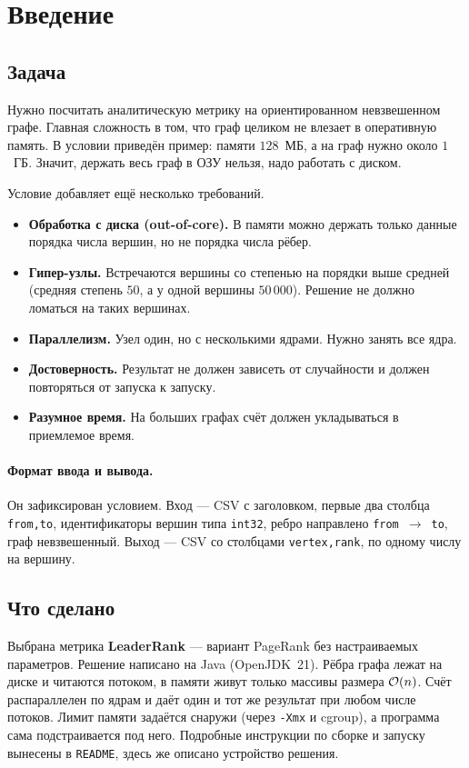 \section{Введение}
\label{sec:intro}

\subsection{Задача}
Нужно посчитать аналитическую метрику на ориентированном невзвешенном графе. Главная сложность в
том, что граф целиком не влезает в оперативную память. В условии приведён пример: памяти $128$~МБ, а
на граф нужно около $1$~ГБ. Значит, держать весь граф в ОЗУ нельзя, надо работать с диском.

Условие добавляет ещё несколько требований.
\begin{itemize}[nosep]
  \item \textbf{Обработка с диска (out-of-core).} В памяти можно держать только данные порядка числа
        вершин, но не порядка числа рёбер.
  \item \textbf{Гипер-узлы.} Встречаются вершины со степенью на порядки выше средней (средняя степень
        $50$, а у одной вершины $50\,000$). Решение не должно ломаться на таких вершинах.
  \item \textbf{Параллелизм.} Узел один, но с несколькими ядрами. Нужно занять все ядра.
  \item \textbf{Достоверность.} Результат не должен зависеть от случайности и должен повторяться от
        запуска к запуску.
  \item \textbf{Разумное время.} На больших графах счёт должен укладываться в приемлемое время.
\end{itemize}

\paragraph{Формат ввода и вывода.} Он зафиксирован условием. Вход --- CSV с заголовком, первые два
столбца \texttt{from,to}, идентификаторы вершин типа \texttt{int32}, ребро направлено
\texttt{from}~$\to$~\texttt{to}, граф невзвешенный. Выход --- CSV со столбцами \texttt{vertex,rank},
по одному числу на вершину.

\subsection{Что сделано}
Выбрана метрика \textbf{LeaderRank} --- вариант PageRank без настраиваемых параметров. Решение
написано на Java (OpenJDK~21). Рёбра графа лежат на диске и читаются потоком, в памяти живут только
массивы размера $\mathcal{O}(n)$. Счёт распараллелен по ядрам и даёт один и тот же результат при любом
числе потоков. Лимит памяти задаётся снаружи (через \texttt{-Xmx} и cgroup), а программа сама
подстраивается под него. Подробные инструкции по сборке и запуску вынесены в \texttt{README},
здесь же описано устройство решения.

